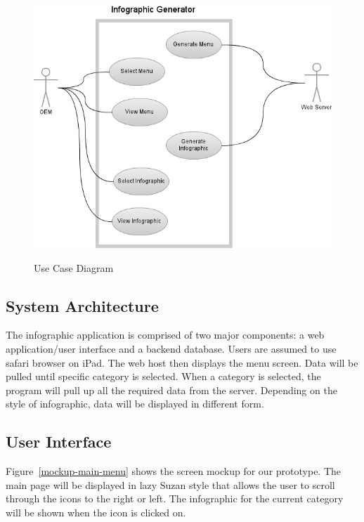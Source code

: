\documentclass[11pt,a4paper,oneside]{article}
\begin{document}
\begin{figure}[!]
\caption{Use Case Diagram}
\includegraphics[width=1\textwidth]{images/Capstone_-_Use_Case_Diagram.png}\\   
\end{figure}


\subsection{System Architecture}

The infographic application is comprised of two major components: a web application/user interface and a backend database. Users are assumed to use safari browser on iPad. The web host then displays the menu screen. Data will be pulled until specific category is selected. When a category is selected, the program will pull up all the required data from the server. Depending on the style of infographic, data will be displayed in different form.\\

\subsection{User Interface}

Figure~\ref{mockup-main-menu} shows the screen mockup for our prototype.  The main page will be displayed in lazy Suzan style that allows the user to scroll through the icons to the right or left.  The infographic for the current category will be shown when the icon is clicked on.\\
\end{document}
